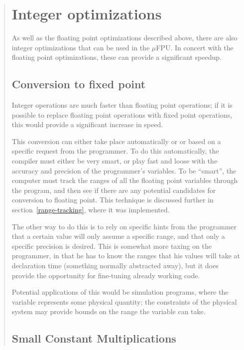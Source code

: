 \begin{quote}
\section{Integer optimizations}

As well as the floating point optimizations described above, there are
also integer optimizations that can be used in the $\mu$FPU.  In concert
with the floating point optimizations, these can provide a significant
speedup.  

\subsection{Conversion to fixed point}

Integer operations are much faster than floating point operations; if it is
possible to replace floating point operations with fixed point operations,
this would provide a significant increase in speed.

This conversion can either take place automatically or or based on a
specific request from the programmer.  To do this automatically, the
compiler must either be very smart, or play fast and loose with the accuracy
and precision of the programmer's variables.  To be ``smart'', the computer
must track the ranges of all the floating point variables through the
program, and then see if there are any potential candidates for conversion
to floating point.  This technique is discussed further in
section~\ref{range-tracking}, where it was implemented.

The other way to do this is to rely on specific hints from the programmer
that a certain value will only assume a specific range, and that only a
specific precision is desired.  This is somewhat more taxing on the
programmer, in that he has to know the ranges that his values will take at
declaration time (something normally abstracted away), but it does provide
the opportunity for fine-tuning already working code.

Potential applications of this would be simulation programs, where the
variable represents some physical quantity; the constraints of the physical
system may provide bounds on the range the variable can take.
\subsection{Small Constant Multiplications}


\end{quote}
